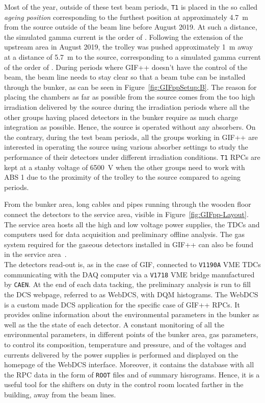 	Most of the year, outside of these test beam periods, \texttt{T1} is placed in the so called \textit{ageing position} corresponding to the furthest position at approximately \SI{4.7}{m} from the source outside of the beam line before August 2019. At such a distance, the simulated gamma current is the order of  \siflux. Following the extension of the upstream area in August 2019, the trolley was pushed approximately \SI{1}{m} away at a distance of \SI{5.7}{m} to the source, corresponding to a simulated gamma current of the order of  \siflux. During periods where GIF++ doesn't have the control of the beam, the beam line needs to stay clear so that a beam tube can be installed through the bunker, as can be seen in Figure~\ref{fig:GIFppSetup:B}. The reason for placing the chambers as far as possible from the source comes from the too high irradiation delivered by the source during the irradiation periods where all the other groups having placed detectors in the bunker require as much charge integration as possible. Hence, the source is operated without any absorbers. On the contrary, during the test beam periods, all the groups working in GIF++ are interested in operating the source using various absorber settings to study the performance of their detectors under different irradiation conditions. \texttt{T1} RPCs are kept at a stanby voltage of \SI{6500}{V} when the other groups need to work with ABS 1 due to the proximity of the trolley to the source compared to ageing periods.
	
	From the bunker area, long cables and pipes running through the wooden floor connect the detectors to the service area, visible in Figure~\ref{fig:GIFpp-Layout}. The service area hosts all the high and low voltage power supplies, the TDCs and computers used for data acquisition and preliminary offline analysis. The gas system required for the gaseous detectors installed in GIF++ can also be found in the service area~\cite{WEBDCS}.\\
	The detectors read-out is, as in the case of GIF, connected to \texttt{V1190A} VME TDCs communicating with the DAQ computer via a \texttt{V1718} VME bridge manufactured by \texttt{CAEN}. At the end of each data tacking, the preliminary analysis is run to fill the \acl{DCS} webpage, referred to as WebDCS, with \acf{DQM} histograms. The WebDCS is a custom made DCS application for the specific case of GIF++ RPCs. It provides online information about the environmental parameters in the bunker as well as the the state of each detector. A constant monitoring of all the environmental parameters, in different points of the bunker area, gas parameters, to control its composition, temperature and pressure, and of the voltages and currents delivered by the power supplies is performed and displayed on the homepage of the WebDCS interface. Moreover, it contains the database with all the RPC data in the form of \texttt{ROOT} files and of summary hisrograms. Hence, it is a useful tool for the shifters on duty in the control room located farther in the building, away from the beam lines.

